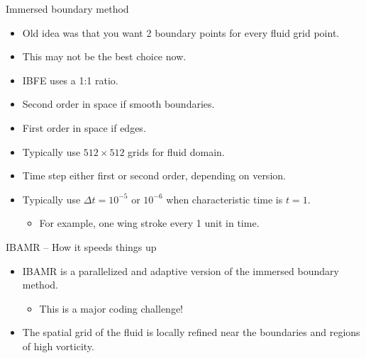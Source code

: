 \documentclass{beamer}
\begin{document}
\begin{frame}{Immersed boundary method}
\small
\begin{itemize}
    \item Old idea was that you want 2 boundary points for every fluid grid point.
    \item This may not be the best choice now.
    \item IBFE uses a 1:1 ratio.
    \item Second order in space if smooth boundaries.
    \item First order in space if edges.
    \item Typically use $512\times512$ grids for fluid domain.
    \item Time step either first or second order, depending on version.
    \item Typically use $\Delta t = 10^{-5}$ or $10^{-6}$ when characteristic time is $t=1$.
    \begin{itemize}
        \item For example, one wing stroke every 1 unit in time.
    \end{itemize}
\end{itemize}
\end{frame}

\begin{frame}{IBAMR -- How it speeds things up}
\small
\begin{itemize}
    \item IBAMR is a parallelized and adaptive version of the immersed boundary method.
    \begin{itemize}
        \item This is a major coding challenge!
    \end{itemize}
    \item The spatial grid of the fluid is locally refined near the boundaries and regions of high vorticity.
\end{itemize}
\end{frame}
\end{document}
